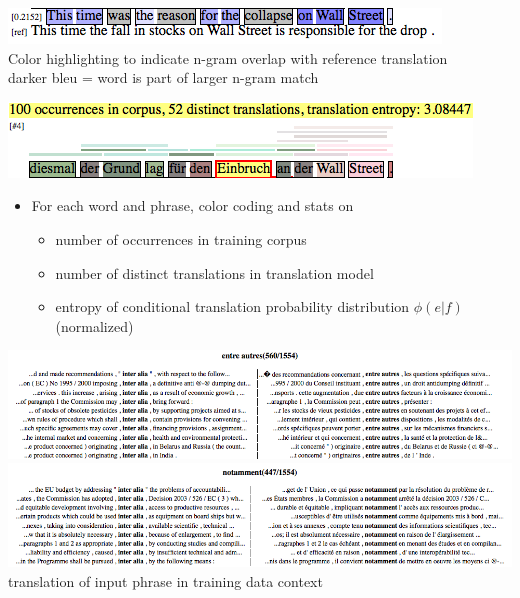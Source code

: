 \documentclass[landscape]{uedslides2C}
\begin{document}

\vspace{30mm}
\begin{center}
\includegraphics[scale=1.5]{analysis-bleu.png}\\[20mm]
Color highlighting to indicate n-gram overlap with reference translation\\[5mm]
darker bleu = word is part of larger n-gram match
\end{center}


\vspace{10mm}
\begin{center}
\includegraphics[scale=1.5]{analysis-coverage.png}\\[20mm]
\end{center}
\begin{itemize}
\item For each word and phrase, color coding and stats on
\begin{itemize}
\item number of occurrences in training corpus
\item number of distinct translations in translation model
\item entropy of conditional translation probability distribution $\phi(e|f)$ (normalized)
\end{itemize}
\end{itemize}


\vspace{-5mm}
\begin{center}
\includegraphics[scale=0.75]{biconcor1.png}\\[5mm]
\includegraphics[scale=0.75]{biconcor2.png}\\
translation of input phrase in training data context
\end{center}
\end{document}
